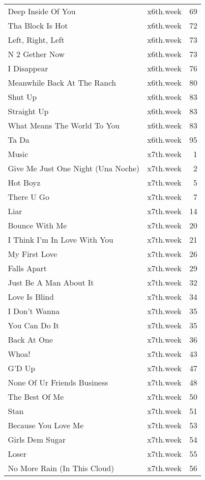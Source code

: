 \begin{table}[ht]
\begin{tabular}{llr}
  Deep Inside Of You & x6th.week &  69 \\ 
  Tha Block Is Hot & x6th.week &  72 \\ 
  Left, Right, Left & x6th.week &  73 \\ 
  N 2 Gether Now & x6th.week &  73 \\ 
  I Disappear & x6th.week &  76 \\ 
  Meanwhile Back At The Ranch & x6th.week &  80 \\ 
  Shut Up & x6th.week &  83 \\ 
  Straight Up & x6th.week &  83 \\ 
  What Means The World To You & x6th.week &  83 \\ 
  Ta Da & x6th.week &  95 \\ 
  Music & x7th.week &   1 \\ 
  Give Me Just One Night (Una Noche) & x7th.week &   2 \\ 
  Hot Boyz & x7th.week &   5 \\ 
  There U Go & x7th.week &   7 \\ 
  Liar & x7th.week &  14 \\ 
  Bounce With Me & x7th.week &  20 \\ 
  I Think I'm In Love With You & x7th.week &  21 \\ 
  My First Love & x7th.week &  26 \\ 
  Falls Apart & x7th.week &  29 \\ 
  Just Be A Man About It & x7th.week &  32 \\ 
  Love Is Blind & x7th.week &  34 \\ 
  I Don't Wanna & x7th.week &  35 \\ 
  You Can Do It & x7th.week &  35 \\ 
  Back At One & x7th.week &  36 \\ 
  Whoa! & x7th.week &  43 \\ 
  G'D Up & x7th.week &  47 \\ 
  None Of Ur Friends Business & x7th.week &  48 \\ 
  The Best Of Me & x7th.week &  50 \\ 
  Stan & x7th.week &  51 \\ 
  Because You Love Me & x7th.week &  53 \\ 
  Girls Dem Sugar & x7th.week &  54 \\ 
  Loser & x7th.week &  55 \\ 
  No More Rain (In This Cloud) & x7th.week &  56 \\ 

\end{tabular}
\end{table}
